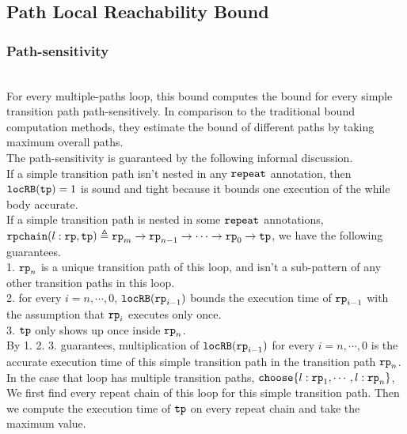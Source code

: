 \subsection{Path Local Reachability Bound}
\subsubsection{Path-sensitivity}
  \\
  For every multiple-paths loop,
  this bound computes the bound for every simple transition path path-sensitively.
  In comparison to the traditional bound computation methods, they
  estimate the bound of different paths by taking maximum overall paths.
  \\
  The path-sensitivity is guaranteed by the following informal discussion.
  \\
  If a simple transition path isn't nested in any $\mathtt{repeat}$ annotation, then
  $\mathtt{locRB}(\mathtt{tp}) = 1$ is sound and tight because it bounds one execution of the while body accurate.
  \\
  If a simple transition path is nested in some $\mathtt{repeat}$ annotations,
  $\mathtt{rpchain}(l: \mathtt{rp}, \mathtt{tp}) \triangleq \mathtt{rp}_m \to \mathtt{rp}_{n-1} \to \cdots \to \mathtt{rp}_{0} \to \mathtt{tp}$, we have the following guarantees.
  \\
  1. $\mathtt{rp}_n$ is a unique transition path of this loop,
  and isn't a sub-pattern of any other transition paths in this loop.
  \\
  2. for every $i = n, \cdots, 0$, $\mathtt{locRB}(\mathtt{rp}_{i - 1})$ bounds the execution time of $\mathtt{rp}_{i - 1}$ with the assumption that $\mathtt{rp}_{i}$ executes only once.
  \\
  3. $\mathtt{tp}$ only shows up once inside $\mathtt{rp}_n$.
  \\
  By 1. 2. 3. guarantees, multiplication of $\mathtt{locRB}(\mathtt{rp}_{i - 1})$ for every $i = n, \cdots, 0$ is the accurate execution time of this
  simple transition path in the transition path $\mathtt{rp}_n$.
  \\
  In the case that loop has multiple transition paths, $\rpchoose{l: \rprog_1, \cdots, l: \rprog_n}$,
  \\
  We first find every repeat chain of this loop for this simple transition path.
  Then we compute the execution time of $\mathtt{tp}$ on every repeat chain and take the maximum value.

